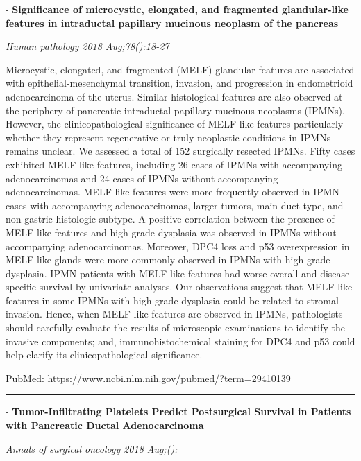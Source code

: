 \documentclass[]{article}
\begin{document}
 - \textbf{Significance of microcystic, elongated, and fragmented
glandular-like features in intraductal papillary mucinous neoplasm of
the pancreas}

\emph{Human pathology 2018 Aug;78():18-27}

Microcystic, elongated, and fragmented (MELF) glandular features are
associated with epithelial-mesenchymal transition, invasion, and
progression in endometrioid adenocarcinoma of the uterus. Similar
histological features are also observed at the periphery of pancreatic
intraductal papillary mucinous neoplasms (IPMNs). However, the
clinicopathological significance of MELF-like features-particularly
whether they represent regenerative or truly neoplastic conditions-in
IPMNs remains unclear. We assessed a total of 152 surgically resected
IPMNs. Fifty cases exhibited MELF-like features, including 26 cases of
IPMNs with accompanying adenocarcinomas and 24 cases of IPMNs without
accompanying adenocarcinomas. MELF-like features were more frequently
observed in IPMN cases with accompanying adenocarcinomas, larger tumors,
main-duct type, and non-gastric histologic subtype. A positive
correlation between the presence of MELF-like features and high-grade
dysplasia was observed in IPMNs without accompanying adenocarcinomas.
Moreover, DPC4 loss and p53 overexpression in MELF-like glands were more
commonly observed in IPMNs with high-grade dysplasia. IPMN patients with
MELF-like features had worse overall and disease-specific survival by
univariate analyses. Our observations suggest that MELF-like features in
some IPMNs with high-grade dysplasia could be related to stromal
invasion. Hence, when MELF-like features are observed in IPMNs,
pathologists should carefully evaluate the results of microscopic
examinations to identify the invasive components; and,
immunohistochemical staining for DPC4 and p53 could help clarify its
clinicopathological significance.

PubMed: \url{https://www.ncbi.nlm.nih.gov/pubmed/?term=29410139}

{}

{}

\begin{center}\rule{0.5\linewidth}{\linethickness}\end{center}

 - \textbf{Tumor-Infiltrating Platelets Predict Postsurgical Survival in
Patients with Pancreatic Ductal Adenocarcinoma}

\emph{Annals of surgical oncology 2018 Aug;():}
\end{document}
